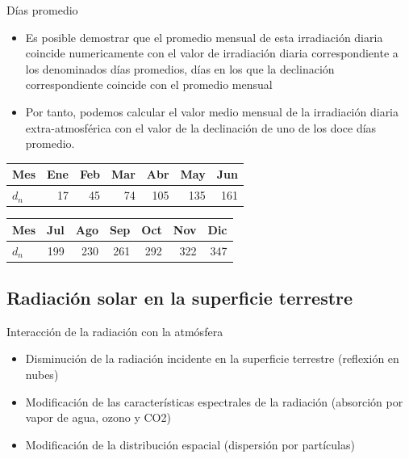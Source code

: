 \documentclass[xcolor={usenames,svgnames,dvipsnames}]{beamer}
\begin{document}
\begin{frame}[label={sec:org304e9b6}]{Días promedio}
\begin{itemize}
\item Es posible demostrar que el \alert{promedio mensual} de esta irradiación
diaria \alert{coincide numericamente} con el valor de irradiación diaria
correspondiente a los denominados \alert{días promedios}, días en los que
la declinación correspondiente coincide con el promedio mensual

\item Por tanto, podemos calcular el valor medio mensual de la irradiación
diaria extra-atmosférica con el valor de la declinación de uno de los
doce días promedio.
\end{itemize}

\begin{center}
\begin{tabular}{lrrrrrr}
Mes & Ene & Feb & Mar & Abr & May & Jun\\
\hline
\(d_n\) & 17 & 45 & 74 & 105 & 135 & 161\\
\end{tabular}
\end{center}

\begin{center}
\begin{tabular}{lrrrrrr}
Mes & Jul & Ago & Sep & Oct & Nov & Dic\\
\hline
\(d_n\) & 199 & 230 & 261 & 292 & 322 & 347\\
\end{tabular}
\end{center}
\end{frame}

\subsection{Radiación solar en la superficie terrestre}
\label{sec:org7b96534}

\begin{frame}[label={sec:org17495b2}]{Interacción de la radiación con la atmósfera}
\begin{itemize}
\item \alert{Disminución} de la radiación incidente en la superficie terrestre
(reflexión en nubes)

\item \alert{Modificación de las características espectrales} de la radiación
(absorción por vapor de agua, ozono y CO2)

\item \alert{Modificación de la distribución espacial} (dispersión por
partículas)
\end{itemize}
\end{frame}
\end{document}
